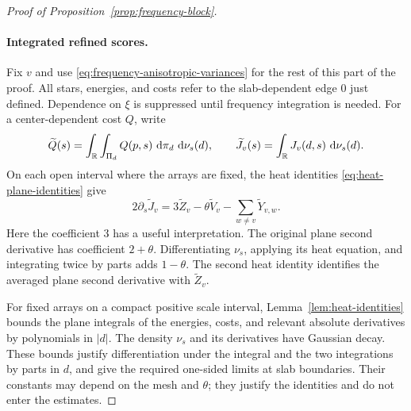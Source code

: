 \begin{proof}[Proof of Proposition~\ref{prop:frequency-block}]
\paragraph{Integrated refined scores.}
Fix $v$ and use \eqref{eq:frequency-anisotropic-variances} for the
rest of this part of the proof.  All stars, energies, and costs
refer to the slab-dependent edge $0$ just defined.  Dependence
on $\xi$ is suppressed until frequency integration is needed.
For a center-dependent cost $Q$, write
\[
 \widetilde Q(s)=\int_{\mathbb R}\int_{\Pi_d}Q(p,s)
                         \,\,\mathrm d\pi_d\,\,\mathrm d\nu_s(d),\qquad
 \widetilde J_v(s)=\int_{\mathbb R}J_v(d,s)\,\,\mathrm d\nu_s(d).
\]
On each open interval where the arrays are fixed, the heat identities
\eqref{eq:heat-plane-identities} give
\begin{equation}\label{eq:frequency-averaged-heat}
 2\partial_s\widetilde J_v
   =3\widetilde Z_v-\theta\widetilde V_v
                           -\sum_{w\ne v}\widetilde Y_{v,w}.
\end{equation}
Here the coefficient $3$ has a useful interpretation.  The original
plane second derivative has coefficient $2+\theta$.  Differentiating
$\nu_s$, applying its heat equation, and integrating twice by parts
adds $1-\theta$.  The second heat identity identifies the averaged
plane second derivative with $\widetilde Z_v$.

For fixed arrays on a compact positive scale interval,
Lemma~\ref{lem:heat-identities} bounds the plane integrals of the
energies, costs, and relevant absolute derivatives by polynomials in
$|d|$. The density $\nu_s$ and its derivatives have Gaussian decay.
These bounds justify differentiation under the integral and the two
integrations by parts in $d$, and give the required one-sided limits
at slab boundaries. Their constants may depend on the mesh and
$\theta$; they justify the identities and do not enter the estimates.


\end{proof}
